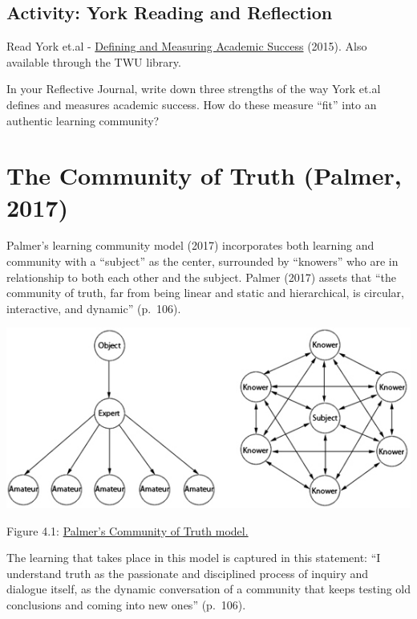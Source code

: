 \documentclass[
]{book}
\begin{document}
\hypertarget{activity-york-reading-and-reflection}{%
\subsection*{Activity: York Reading and Reflection}\label{activity-york-reading-and-reflection}}

\begin{reflect}
Read York et.al - \href{https://eric.ed.gov/?q=EJ1059739}{Defining and
Measuring Academic Success} (2015). Also available through the TWU
library.

In your Reflective Journal, write down three strengths of the way York
et.al defines and measures academic success. How do these measure
``fit'' into an authentic learning community?
\end{reflect}

\hypertarget{the-community-of-truth-palmer-2017}{%
\section{The Community of Truth (Palmer, 2017)}\label{the-community-of-truth-palmer-2017}}

Palmer's learning community model (2017) incorporates both learning and community with a ``subject'' as the center, surrounded by ``knowers'' who are in relationship to both each other and the subject. Palmer (2017) assets that ``the community of truth, far from being linear and static and hierarchical, is circular, interactive, and dynamic'' (p.~106).

\includegraphics{assets/unit4/ParkerDiscussion.jpg}

Figure 4.1: \href{https://uncc.instructure.com/courses/342/pages/module-3-why-discussions}{Palmer's Community of Truth model.}

The learning that takes place in this model is captured in this statement: ``I understand truth as the passionate and disciplined process of inquiry and dialogue itself, as the dynamic conversation of a community that keeps testing old conclusions and coming into new ones'' (p.~106).
\end{document}
